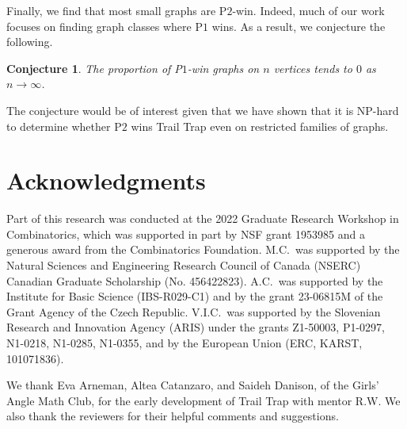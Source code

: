 \documentclass{article}
\theoremstyle{plain}
\newtheorem{conjecture}[theorem]{Conjecture}
\theoremstyle{definition}
\def\pone{{\rm{P}\ensuremath{1}}}
\def\ptwo{{\rm{P}\ensuremath{2}}}
\begin{document}
Finally, we find that most small graphs are \ptwo{}-win. Indeed, much of our work focuses on finding graph classes where \pone{} wins. As a result, we conjecture the following.
\begin{conjecture}\label{conj:asymptotic}
    The proportion of \pone{}-win graphs on $n$ vertices tends to $0$ as $n\to \infty$. 
\end{conjecture}
The conjecture would be of interest given that we have shown that it is NP-hard to determine whether \ptwo{} wins {\sc Trail Trap} even on restricted families of graphs. 

\section*{Acknowledgments}
Part of this research was conducted at the 2022 Graduate Research Workshop in Combinatorics, which was supported in part by NSF grant 1953985 and a generous award from the Combinatorics Foundation.
M.C.~was supported by the Natural Sciences and Engineering Research Council of Canada (NSERC) Canadian Graduate Scholarship (No. 456422823). 
A.C.~was supported by the Institute for Basic Science (IBS-R029-C1) and by the grant 23-06815M of the Grant Agency of the Czech Republic. 
V.I.C.~was supported by the Slovenian Research and Innovation Agency (ARIS) under the grants Z1-50003, P1-0297, N1-0218, N1-0285, N1-0355, and by the European Union (ERC, KARST, 101071836). 

We thank Eva Arneman, Altea Catanzaro, and Saideh Danison, of the Girls' Angle Math Club, for the early development of {\sc Trail Trap} with mentor R.W. We also thank the reviewers for their helpful comments and suggestions. 
\end{document}
